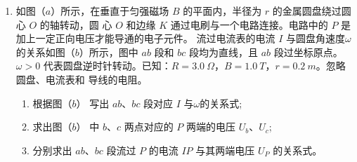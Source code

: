 \begin{enumerate}
\item 
{}
如图（$ a $）所示，在垂直于匀强磁场 $ B $ 的平面内，半径为 $ r $ 的金属圆盘绕过圆心 $ O $ 的轴转动，圆
心 $ O $ 和边缘 $ K $ 通过电刷与一个电路连接。电路中的 $ P $ 是加上一定正向电压才能导通的电子元件。
流过电流表的电流 $ I $ 与圆盘角速度$ \omega $的关系如图（$ b $）所示，图中 $ ab $ 段和 $ bc $ 段均为直线，且 $ ab $
段过坐标原点。$ \omega >0 $ 代表圆盘逆时针转动。已知：$ R=3.0 \ \Omega $，$ B=1.0 \ T $，$ r=0.2 \ m $。忽略圆盘、电流表和
导线的电阻。
\begin{enumerate}
\item
根据图（$ b $）
写出 $ ab $、$ bc $ 段对应 $ I $
与$ \omega $的关系式;


\item 
求出图（$ b $）
中 $ b $、$ c $ 两点对应的 $ P $
两端的电压 $ U_{b} $、$ U_{c} $;


\item 
分别求出 $ ab $、$ bc $ 段流过 $ P $ 的电流 $ IP $ 与其两端电压 $ U_P $ 的关系式。

\end{enumerate}
\begin{figure}[h!]
\centering
\begin{subfigure}{0.4\linewidth}
\centering
 
\caption{}\label{}
\end{subfigure}
\begin{subfigure}{0.4\linewidth}
\centering
 
\caption{}\label{}
\end{subfigure}
\end{figure}




\end{enumerate}
